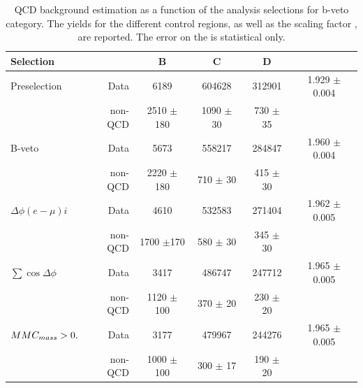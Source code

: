 \begin{table} [p]
	\begin{tabular}[c]{l r c c c c}
\hline
\hline 
Selection  &  		& B & C & D &  \rqcd \\ 
\hline
Preselection 	&   Data	&6189			&604628			&312901		    &	1.929 $\pm$  	0.004		\\
	        &   non-QCD	&2510 $\pm$  180  	&1090 $\pm$   30  	&730	$\pm$ 35    &				\\
\hline
B-veto	     	&   Data	&5673		  & 558217 		& 284847		    &	1.960	$\pm$	0.004	\\
	     	&   non-QCD	&2220	$\pm$ 180 & 710 $\pm$ 30	& 415 $\pm$	30	    &				\\
\hline
$\Delta\phi(e-\mu)i$  &   Data		&4610		&532583 		&271404		    	    &	1.962	$\pm$	0.005	\\
	     &   non-QCD	&1700 $\pm$170	&580 $\pm$	30	& 345 $\pm$	30	    &				\\
\hline
$\sum\cos\Delta\phi$ &   Data& 3417	&486747 		& 247712	   		    &	1.965	$\pm$	0.005 	\\
	     &   non-QCD     & 1120  $\pm$ 100	& 370 $\pm$ 	20		& 230 $\pm$	20  &				\\
\hline
$MMC_{mass} > 0.$    &  Data		& 3177		& 479967 		& 244276	    	    &	1.965	$\pm$	0.005	\\
	     &   non-QCD	& 1000 $\pm$ 100	& 300  $\pm$ 17		&190	$\pm$ 20    &			\\[1ex]
\hline
\hline
	\end{tabular}
	\caption{QCD background estimation as a function of the analysis selections for b-veto category. The yields for the different control regions, as well as the scaling factor \rqcd, are reported. The error on the \rqcd is statistical only.}
	\centering
	\label{table:qcd_yield_bveto}
\end{table}



